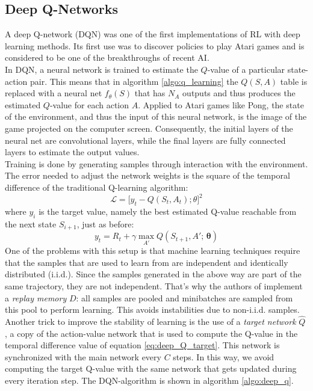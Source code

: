 \subsection{Deep Q-Networks}
\label{sec:deep_qn}
A deep Q-network (DQN) was one of the first implementations of RL with deep learning methods. Its first use was to discover policies to play Atari games \cite{mnih2013playing} and is considered to be one of the breakthroughs of recent AI.\\
In DQN, a neural network is trained to estimate the $Q$-value of a particular state-action pair. This means that in algorithm \ref{algo:q_learning} the $Q(S,A)$ table is replaced with a neural net $f_{\theta}(S)$ that has $N_A$ outputs and thus  produces the estimated $Q$-value for each action $A$. Applied to Atari games like Pong, the state of the environment, and thus the input of this neural network, is the image of the game projected on the computer screen. Consequently, the initial layers of the neural net are convolutional layers, while the final layers are fully connected layers to estimate the output values.\\
Training is done by generating samples through interaction with the environment. The error needed to adjust the network weights is the square of the temporal difference of the traditional Q-learning algorithm:
\begin{equation}
\mathcal{L} = \big [y_t - Q(S_t, A_t); \theta \big ]^2
\label{eq:deep_Q_update}
\end{equation}
where $y_i$ is the target value, namely the best estimated Q-value reachable from the next state $S_{i+1}$, just as before:
\begin{equation}
y_t = R_t + \gamma \max_{A'} Q(S_{t+1}, A';\, \bm{\theta})
\label{eq:deep_Q_target}
\end{equation}
One of the problems with this setup is that machine learning techniques require that the samples that are used to learn from are independent and identically distributed (i.i.d.). Since the samples generated in the above way are part of the same trajectory, they are not independent. That's why the authors of \cite{mnih2015human} implement a \emph{replay memory} $D$: all samples are pooled and minibatches are sampled from this pool to perform learning. This avoids instabilities due to non-i.i.d. samples.\\
Another trick to improve the stability of learning is the use of a \emph{target network}  $\hat{Q}$ \cite{mnih2015human}, a copy of the action-value network that is used to compute the Q-value in the temporal difference value of equation \ref{eq:deep_Q_target}. This network is synchronized with the main network every $C$ steps. In this way, we avoid computing the target Q-value with the same network that gets updated during every iteration step. The DQN-algorithm is shown in algorithm \ref{algo:deep_q}. \\
